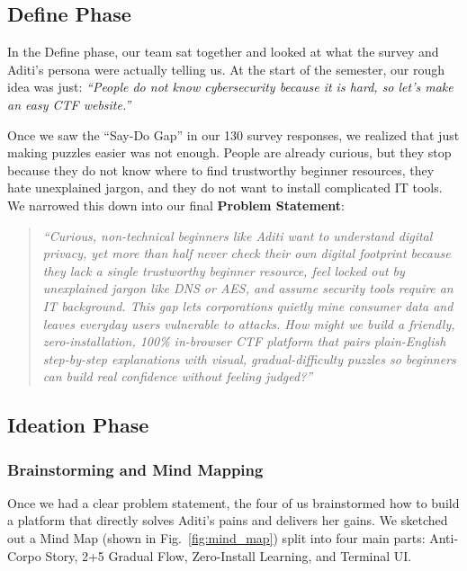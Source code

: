 \documentclass[11pt,a4paper]{article}
\begin{document}
\subsection{Define Phase}
In the Define phase, our team sat together and looked at what the survey and Aditi's persona were actually telling us. At the start of the semester, our rough idea was just: \textit{``People do not know cybersecurity because it is hard, so let's make an easy CTF website.''}

Once we saw the ``Say-Do Gap'' in our 130 survey responses, we realized that just making puzzles easier was not enough. People are already curious, but they stop because they do not know where to find trustworthy beginner resources, they hate unexplained jargon, and they do not want to install complicated IT tools. We narrowed this down into our final \textbf{Problem Statement}:

\begin{quote}
\textit{``Curious, non-technical beginners like Aditi want to understand digital privacy, yet more than half never check their own digital footprint because they lack a single trustworthy beginner resource, feel locked out by unexplained jargon like DNS or AES, and assume security tools require an IT background. This gap lets corporations quietly mine consumer data and leaves everyday users vulnerable to attacks. How might we build a friendly, zero-installation, 100\% in-browser CTF platform that pairs plain-English step-by-step explanations with visual, gradual-difficulty puzzles so beginners can build real confidence without feeling judged?''}
\end{quote}

\subsection{Ideation Phase}

\subsubsection{Brainstorming and Mind Mapping}
Once we had a clear problem statement, the four of us brainstormed how to build a platform that directly solves Aditi's pains and delivers her gains. We sketched out a Mind Map (shown in Fig.~\ref{fig:mind_map}) split into four main parts: Anti-Corpo Story, 2+5 Gradual Flow, Zero-Install Learning, and Terminal UI.
\end{document}

